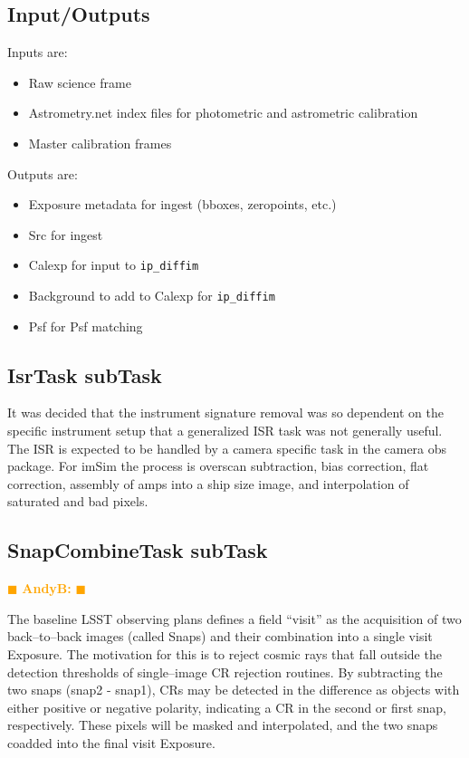 \documentclass[12pt]{article}
\newcommand{\becker} { \textcolor{orange} {
\ensuremath{\blacksquare} {\bf AndyB:}  
\ensuremath{\blacksquare} } }
\begin{document}
\subsection{Input/Outputs}
Inputs are:
\begin{itemize}
\item Raw science frame
\item Astrometry.net index files for photometric and astrometric calibration
\item Master calibration frames
\end{itemize}

Outputs are:
\begin{itemize}
\item Exposure metadata for ingest (bboxes, zeropoints, etc.)
\item Src for ingest
\item Calexp for input to {\tt ip\_diffim}
\item Background to add to Calexp for {\tt ip\_diffim}
\item Psf for Psf matching
\end{itemize}

\subsection{IsrTask subTask}
It was decided that the instrument signature removal was so dependent on the specific instrument setup that a generalized
ISR task was not generally useful.  The ISR is expected to be handled by a camera specific task in the camera obs package.  
For imSim the process is overscan subtraction, bias correction, flat correction, assembly of amps into a ship size image, 
and interpolation of saturated and bad pixels.

\subsection{SnapCombineTask subTask} \becker

The baseline LSST observing plans defines a field ``visit'' as the
acquisition of two back--to--back images (called Snaps) and their
combination into a single visit Exposure.  The motivation for this is
to reject cosmic rays that fall outside the detection thresholds of
single--image CR rejection routines.  By subtracting the two snaps
(snap2 - snap1), CRs may be detected in the difference as objects with
either positive or negative polarity, indicating a CR in the second or
first snap, respectively.  These pixels will be masked and
interpolated, and the two snaps coadded into the final visit Exposure.
\end{document}
